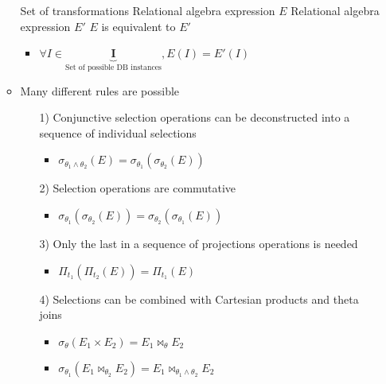 \begin{itemize}
\begin{itemize}
             Set of transformations
             Relational algebra expression $E$
             Relational algebra expression $E'$
             $E$ is equivalent to $E'$
                \begin{itemize}
                    \item $\forall I \in \underbrace{\mathbf{I}}_{\text{Set of possible DB instances}}, E(I) = E'(I)$
                \end{itemize}
            \item Many different rules are possible
                \begin{itemize}
                    \item[1)] Conjunctive selection operations can be deconstructed into a sequence of individual selections
                        \begin{itemize}
                            \item $\sigma_{\theta_1 \wedge \theta_2}(E) = \sigma_{\theta_1}(\sigma_{\theta_2}(E))$
                        \end{itemize}
                    \item[2)] Selection operations are commutative
                        \begin{itemize}
                            \item $\sigma_{\theta_1}(\sigma_{\theta_2}(E)) = \sigma_{\theta_2}(\sigma_{\theta_1}(E))$
                        \end{itemize}
                    \item[3)] Only the last in a sequence of projections operations is needed
                        \begin{itemize}
                            \item $\Pi_{t_1}(\Pi_{t_2}(E)) = \Pi_{t_1}(E)$
                        \end{itemize}
                    \item[4)] Selections can be combined with Cartesian products and theta joins
                        \begin{itemize}
                            \item $\sigma_\theta(E_1 \times E_2) = E_1 \bowtie_\theta E_2$
                            \item $\sigma_{\theta_1}(E_1 \bowtie_{\theta_2} E_2) = E_1 \bowtie_{\theta_1 \wedge \theta_2} E_2$
                        \end{itemize}

\end{itemize}
\end{itemize}
\end{itemize}
